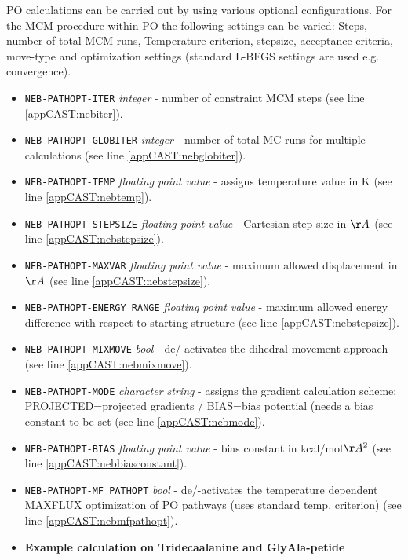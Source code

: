 \documentclass[a4paper,11pt]{scrartcl}
\begin{document}
PO calculations can be carried out by using various optional configurations. For the MCM procedure within PO the following settings can be varied: Steps, number of total MCM runs, Temperature criterion, stepsize, acceptance criteria, move-type and optimization settings (standard L-BFGS settings are used e.g. convergence).
\begin{itemize}

\item \texttt{NEB-PATHOPT-ITER} \textit{integer} - number of constraint MCM steps (see line \ref{appCAST:nebiter}).  

\item \texttt{NEB-PATHOPT-GLOBITER} \textit{integer} - number of total MC runs for multiple calculations (see line \ref{appCAST:nebglobiter}).

\item \texttt{NEB-PATHOPT-TEMP} \textit{floating point value} - assigns temperature value in K (see line \ref{appCAST:nebtemp}).

\item \texttt{NEB-PATHOPT-STEPSIZE} \textit{floating point value} - Cartesian step size in $\AA$ (see line \ref{appCAST:nebstepsize}).

\item \texttt{NEB-PATHOPT-MAXVAR} \textit{floating point value} - maximum allowed displacement in $\AA$ (see line \ref{appCAST:nebstepsize}).

\item \texttt{NEB-PATHOPT-ENERGY\_RANGE} \textit{floating point value} - maximum allowed energy difference with respect to starting structure  (see line \ref{appCAST:nebstepsize}).

\item \texttt{NEB-PATHOPT-MIXMOVE} \textit{bool} - de/-activates the dihedral movement approach (see line \ref{appCAST:nebmixmove}).

\item \texttt{NEB-PATHOPT-MODE} \textit{character string} - assigns the gradient calculation scheme: PROJECTED=projected gradients / BIAS=bias potential (needs a bias constant to be set (see line \ref{appCAST:nebmode}).

\item \texttt{NEB-PATHOPT-BIAS} \textit{floating point value} - bias constant in kcal/mol$\AA^{2}$ (see line \ref{appCAST:nebbiasconstant}).

\item \texttt{NEB-PATHOPT-MF\_PATHOPT} \textit{bool} - de/-activates the temperature dependent MAXFLUX optimization of PO pathways (uses standard temp. criterion) (see line \ref{appCAST:nebmfpathopt}).

\end{itemize}
\begin{itemize}

\item \textbf{Example calculation on Tridecaalanine and GlyAla-petide} \newline

\end{itemize}
\end{document}
